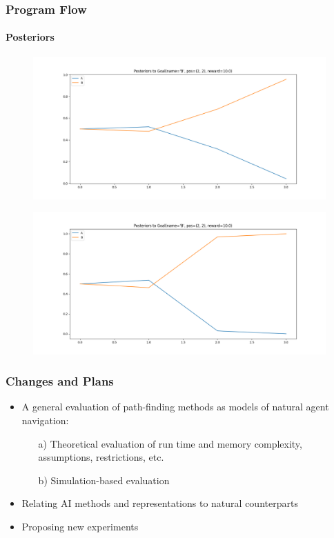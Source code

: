 \documentclass[11pt]{beamer}
\begin{document}
\begin{frame}
	\frametitle{Program Flow}
	\framesubtitle{Posteriors}
	
\begin{figure}
	\centering
	\includegraphics[width=0.7\linewidth]{res/posteriors_m1}
\end{figure}

\begin{figure}
	\centering
	\includegraphics[width=0.7\linewidth]{res/posteriors_m2}
\end{figure}

\end{frame}

\begin{frame}
	\frametitle{Changes and Plans}
	\begin{itemize}
		\item A general evaluation of path-finding methods as models of natural agent navigation:
		\begin{itemize}
		\item[a)] Theoretical evaluation of run time and memory complexity, assumptions, restrictions, etc.
		\item[b)] Simulation-based evaluation
	\end{itemize}
	\item Relating AI methods and representations to natural counterparts
	\item Proposing new experiments 
	\end{itemize}
\end{frame}
\end{document}
